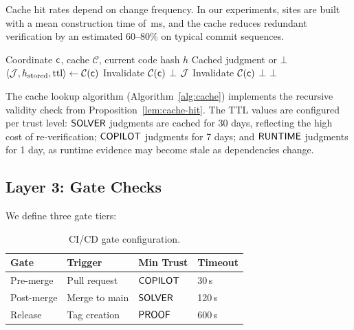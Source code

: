 \documentclass[11pt]{article}
\begin{document}
Cache hit rates depend on change frequency. In our experiments,
\compSiteTotalBuilt{} sites are built with a mean construction time of
\compSiteMeanBuildMs{}\,ms, and the cache reduces redundant verification by
an estimated 60--80\% on typical commit sequences.

\begin{algorithm}[t]
\caption{Judgment Cache Lookup and Invalidation}
\label{alg:cache}
\begin{algorithmic}[1]
\REQUIRE Coordinate $\mathsf{c}$, cache $\mathcal{C}$, current code hash $h$
\ENSURE Cached judgment or $\bot$
  \STATE $\langle \mathcal{J}, h_{\text{stored}}, \text{ttl} \rangle \gets \mathcal{C}(\mathsf{c})$
    \STATE {}
        \STATE Invalidate $\mathcal{C}(\mathsf{c})$
        \RETURN $\bot$
      \ENDIF
    \ENDFOR
    \RETURN $\mathcal{J}$  
  \ELSE
    \STATE Invalidate $\mathcal{C}(\mathsf{c})$
    \RETURN $\bot$  
  \ENDIF
\ELSE
  \RETURN $\bot$  
\ENDIF
\end{algorithmic}
\end{algorithm}

The cache lookup algorithm (Algorithm~\ref{alg:cache}) implements the
recursive validity check from Proposition~\ref{lem:cache-hit}. The TTL
values are configured per trust level: $\mathsf{SOLVER}$ judgments are cached for
30 days, reflecting the high cost of re-verification; $\mathsf{COPILOT}$ judgments
for 7 days; and $\mathsf{RUNTIME}$ judgments for 1 day, as runtime evidence may
become stale as dependencies change.

\subsection{Layer 3: Gate Checks}

We define three gate tiers:

\begin{table}[t]
\centering
\caption{CI/CD gate configuration.}
\label{tab:gates}
\begin{tabular}{llll}
\toprule
\textbf{Gate} & \textbf{Trigger} & \textbf{Min Trust} & \textbf{Timeout} \\
\midrule
Pre-merge  & Pull request & $\mathsf{COPILOT}$ & 30\,s \\
Post-merge & Merge to main & $\mathsf{SOLVER}$ & 120\,s \\
Release    & Tag creation & $\mathsf{PROOF}$ & 600\,s \\
\bottomrule
\end{tabular}
\end{table}
\end{document}
